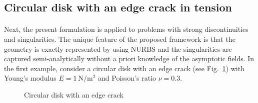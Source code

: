 \subsection{Circular disk with an edge crack in tension}

\paragraph{}
Next, the present formulation is applied to problems with strong discontinuities and singularities.
The unique feature of the proposed framework is that the geometry is exactly represented by using NURBS and the singularities are captured semi-analytically without a priori knowledge of the asymptotic fields.
In the first example, consider a circular disk with an edge crack (see Fig.~\ref{iso_fig:circular_disk_geo_bc}) with Young’s modulus $E=\SI{1}{\newton \per \square \meter}$ and Poisson's ratio $\nu=0.3$.
    \begin{figure}[h!]
        \centering
        \caption{Circular disk with an edge crack}
        \label{iso_fig:circular_disk_geo_bc}
    \end{figure}

